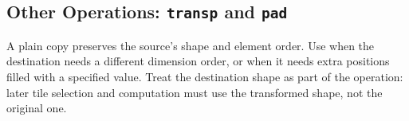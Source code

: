 \subsection*{Other Operations: \texttt{transp} and \texttt{pad}}

A plain copy preserves the source's shape and element order. Use \co@transp@ when the destination needs a different dimension order, or \co@pad@ when it needs extra positions filled with a specified value. Treat the destination shape as part of the operation: later tile selection and computation must use the transformed shape, not the original one.
